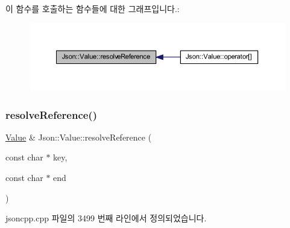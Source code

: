 이 함수를 호출하는 함수들에 대한 그래프입니다.\+:\nopagebreak
\begin{figure}[H]
\begin{center}
\leavevmode
\includegraphics[width=350pt]{class_json_1_1_value_a9ff9cdae2c8f4155bab603d750b0b3f1_icgraph}
\end{center}
\end{figure}
\mbox{\label{class_json_1_1_value_a5f6b3aaf4f2e952a33dd823db008c333}} 
\subsubsection{\texorpdfstring{resolve\+Reference()}{resolveReference()}\hspace{0.1cm}{\footnotesize\ttfamily [2/2]}}
{\footnotesize\ttfamily \hyperlink{class_json_1_1_value}{Value} \& Json\+::\+Value\+::resolve\+Reference (\begin{DoxyParamCaption}\item[{const char $\ast$}]{key,  }\item[{const char $\ast$}]{end }\end{DoxyParamCaption})\hspace{0.3cm}{\ttfamily [private]}}



jsoncpp.\+cpp 파일의 3499 번째 라인에서 정의되었습니다.



